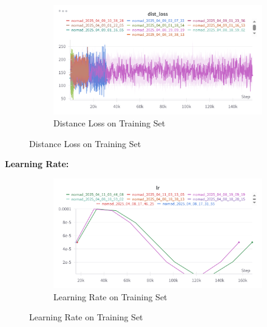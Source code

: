 \documentclass[12pt]{article}
\begin{document}
\begin{figure}[H]
    \centering
    \begin{subfigure}[b]{0.48\textwidth}
        \centering
        \includegraphics[width=\textwidth]{images/dist_loss.png}
        \caption{Distance Loss on Training Set}
        \label{fig:dist_loss}
    \end{subfigure}
    \end{figure}

\noindent \textbf{Learning Rate:}\\
\begin{figure}[H]
    \centering
    \begin{subfigure}[b]{0.48\textwidth}
        \centering
        \includegraphics[width=\textwidth]{images/lr.png}
        \caption{Learning Rate on Training Set}
        \label{fig:lr}
    \end{subfigure}
    \end{figure}
\end{document}
